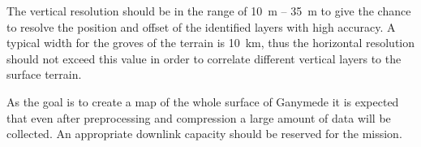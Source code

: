 The vertical resolution should be in the range of 10~m -- 35~m to
give the chance to resolve the position and offset of the identified
layers with high accuracy. A typical width for the groves of the terrain
is 10~km, thus the horizontal resolution should not exceed this value
in order to correlate different vertical layers to the surface terrain. 

As the goal is to create a map of the whole surface of Ganymede it
is expected that even after preprocessing and compression a large
amount of data will be collected. An appropriate downlink capacity
should be reserved for the mission.

